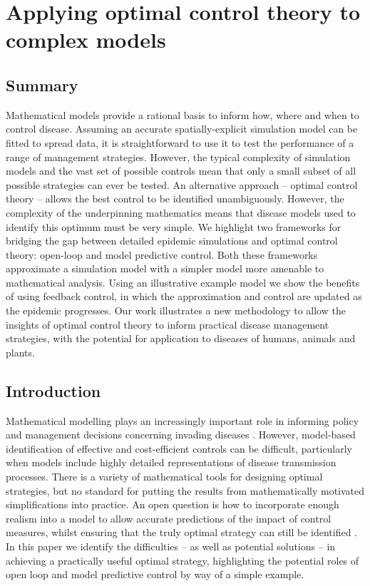 %
\chapter{Applying optimal control theory to complex models}
\label{chap:apply_to_complex}

\section*{Summary}

Mathematical models provide a rational basis to inform how, where and when to control disease. Assuming an accurate spatially-explicit simulation model can be fitted to spread data, it is straightforward to use it to test the performance of a range of management strategies. However, the typical complexity of simulation models and the vast set of possible controls mean that only a small subset of all possible strategies can ever be tested. An alternative approach -- optimal control theory -- allows the best control to be identified unambiguously. However, the complexity of the underpinning mathematics means that disease models used to identify this optimum must be very simple. We highlight two frameworks for bridging the gap between detailed epidemic simulations and optimal control theory: open-loop and model predictive control. Both these frameworks approximate a simulation model with a simpler model more amenable to mathematical analysis. Using an illustrative example model we show the benefits of using feedback control, in which the approximation and control are updated as the epidemic progresses. Our work illustrates a new methodology to allow the insights of optimal control theory to inform practical disease management strategies, with the potential for application to diseases of humans, animals and plants.

\section{Introduction}
\label{sec:Intro}

Mathematical modelling plays an increasingly important role in informing policy and management decisions concerning invading diseases \citep{heesterbeek_modeling_2015, metcalf_six_2015}. However, model-based identification of effective and cost-efficient controls can be difficult, particularly when models include highly detailed representations of disease transmission processes. There is a variety of mathematical tools for designing optimal strategies, but no standard for putting the results from mathematically motivated simplifications into practice. An open question is how to incorporate enough realism into a model to allow accurate predictions of the impact of control measures, whilst ensuring that the truly optimal strategy can still be identified \citep{cunniffe_thirteen_2015}. In this paper we identify the difficulties -- as well as potential solutions -- in achieving a practically useful optimal strategy, highlighting the potential roles of open loop and model predictive control by way of a simple example.

